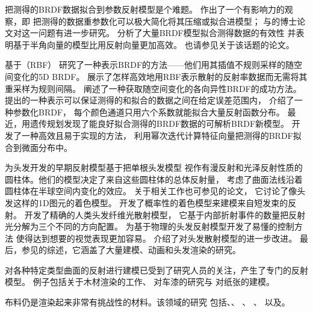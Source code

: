 把测得的BRDF数据拟合到参数反射模型是个难题。
\citet{10.1007/978-3-7091-6453-2_2}作出了一个有影响力的观察，即
把测得的数据重参数化可以极大简化将其压缩或拟合进模型；
\citet{1388224}与\citet{Marschner1998}的博士论文对这一问题有进一步研究。
\citet{ngan:brdfanalysis:egsr2005}分析了大量BRDF模型拟合测得数据的有效性
并表明基于半角向量的模型比用反射向量更加高效。
也请参见\citet{10.1145/1122501.1122502}关于该话题的论文。

\citet{10.5555/2383654.2383690}基于（RBF）
研究了一种表示BRDF的方法——他们用其插值不规则采样的随空间变化的5D BRDF。
\citet{weistroffer2007efficient}展示了怎样高效地用RBF表示散射的反射率数据而无需将其重采样为规则间隔。
\citet{10.1145/1399504.1360640}阐述了一种获取随空间变化的各向异性BRDF的成功方法。
\citet{6165276}提出的一种表示可以保证测得的和拟合的数据之间在给定误差范围内，
\citet{10.1111/j.1467-8659.2012.03147.x}介绍了一种参数化BRDF，
每个颜色通道只用六个系数就能拟合大量反射函数分布。
最近，\citet{10.1145/2601097.2601193}用遗传规划发现了能良好拟合测得的BRDF数据的可解析BRDF新模型。
\citet{10.1111/cgf.12675}开发了一种高效且易于实现的方法，
利用幂次迭代计算特征向量把测得的BRDF拟合到微面分布中。

\citet{10.1145/74333.74361}为头发开发的早期反射模型基于把单根头发模型
视作有漫反射和光泽反射性质的圆柱体。他们的模型决定了来自这些圆柱体的总体反射量，
考虑了曲面法线沿着圆柱体在半球空间内变化的效应。
关于相关工作也可参见\citet{10.1145/192161.192246}的论文，
它讨论了像头发这样的1D图元的着色模型。
\citet{10.1145/258734.258807}开发了概率性的着色模型来建模来自短发束的反射。
\citet{10.1145/882262.882345}开发了精确的人类头发纤维光散射模型，
它基于内部折射事件的数量把反射光分解为三个不同的方向配置。
\citet{10.1145/1778765.1778793}为基于物理的头发反射模型开发了易懂的控制方法
使得达到想要的视觉表现更加容易。
\citet{10.1111/j.1467-8659.2011.01976.x}介绍了对头发散射模型的进一步改进。
最后，参见\citet{4069232}的综述，它涵盖了大量建模、动画和头发渲染的研究。

对各种特定类型曲面的反射进行建模已受到了研究人员的关注，产生了专门的反射模型。
例子包括\citet{10.1145/1186822.1073254}关于木材渲染的工作、
\citet{guenther:05:carpaint}对车漆的研究与
\citet{10.1111/cgf.12420}对纸张的建模。

布料仍是渲染起来非常有挑战性的材料。该领域的研究
包括\citet{2003_sattler_egsr}、\citet{hdl.handle.net/1813/8331}、
\citet{10.1111/j.1467-8659.2011.01987.x}、
\citet{10.1145/2077341.2077352}、\citet{10.1145/2185520.2185571}
以及\citet{10.1145/2451236.2451240}。

